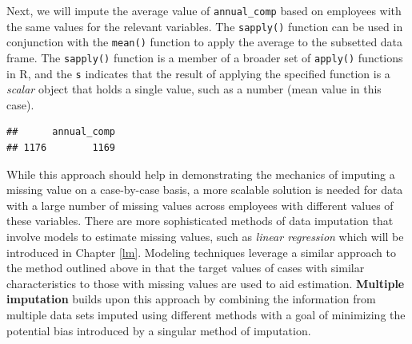 \documentclass[
]{book}
\newenvironment{Shaded}{\begin{snugshade}}{\end{snugshade}}
\newcommand{\AttributeTok}[1]{\textcolor[rgb]{0.77,0.63,0.00}{#1}}
\newcommand{\CommentTok}[1]{\textcolor[rgb]{0.56,0.35,0.01}{\textit{#1}}}
\newcommand{\ConstantTok}[1]{\textcolor[rgb]{0.00,0.00,0.00}{#1}}
\newcommand{\DecValTok}[1]{\textcolor[rgb]{0.00,0.00,0.81}{#1}}
\newcommand{\FunctionTok}[1]{\textcolor[rgb]{0.00,0.00,0.00}{#1}}
\newcommand{\NormalTok}[1]{#1}
\newcommand{\OtherTok}[1]{\textcolor[rgb]{0.56,0.35,0.01}{#1}}
\newcommand{\SpecialCharTok}[1]{\textcolor[rgb]{0.00,0.00,0.00}{#1}}
\newcommand{\StringTok}[1]{\textcolor[rgb]{0.31,0.60,0.02}{#1}}
\begin{document}
Next, we will impute the average value of \texttt{annual\_comp} based on employees with the same values for the relevant variables. The \texttt{sapply()} function can be used in conjunction with the \texttt{mean()} function to apply the average to the subsetted data frame. The \texttt{sapply()} function is a member of a broader set of \texttt{apply()} functions in R, and the \texttt{s} indicates that the result of applying the specified function is a \emph{scalar} object that holds a single value, such as a number (mean value in this case).

\begin{Shaded}
\end{Shaded}

\begin{verbatim}
##      annual_comp
## 1176        1169
\end{verbatim}

While this approach should help in demonstrating the mechanics of imputing a missing value on a case-by-case basis, a more scalable solution is needed for data with a large number of missing values across employees with different values of these variables. There are more sophisticated methods of data imputation that involve models to estimate missing values, such as \emph{linear regression} which will be introduced in Chapter \ref{lm}. Modeling techniques leverage a similar approach to the method outlined above in that the target values of cases with similar characteristics to those with missing values are used to aid estimation. \textbf{Multiple imputation} builds upon this approach by combining the information from multiple data sets imputed using different methods with a goal of minimizing the potential bias introduced by a singular method of imputation.
\end{document}
